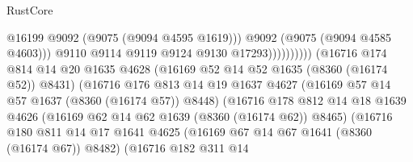 \begin{lexlean}{RustCore}
\begin{coremodule}
                                                            @16199
                                                            @9092
                                                            (@9075 (@9094 @4595 @1619)))
                                                          @9092
                                                          (@9075 (@9094 @4585 @4603)))
                                                        @9110
                                                        @9114
                                                        @9119
                                                        @9124
                                                        @9130
                                                        @17293))))))))))
                                    (@16716
                                      @174
                                      @814
                                      @14
                                      @20
                                      @1635
                                      @4628
                                      (@16169 @52 @14 @52 @1635 (@8360 (@16174 @52)) @8431)
                                      (@16716
                                        @176
                                        @813
                                        @14
                                        @19
                                        @1637
                                        @4627
                                        (@16169 @57 @14 @57 @1637 (@8360 (@16174 @57)) @8448)
                                        (@16716
                                          @178
                                          @812
                                          @14
                                          @18
                                          @1639
                                          @4626
                                          (@16169 @62 @14 @62 @1639 (@8360 (@16174 @62)) @8465)
                                          (@16716
                                            @180
                                            @811
                                            @14
                                            @17
                                            @1641
                                            @4625
                                            (@16169 @67 @14 @67 @1641 (@8360 (@16174 @67)) @8482)
                                            (@16716
                                              @182
                                              @311
                                              @14

\end{coremodule}
\end{lexlean}

